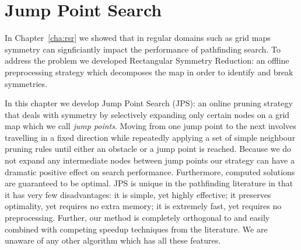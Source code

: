 \chapter{Jump Point Search}
\label{cha:jps}
In Chapter~\ref{cha:rsr} we showed that in regular domains such as grid maps
symmetry can signficiantly impact the performance of pathfinding search.
 To address the problem we developed Rectangular Symmetry Reduction:
 an offline preprocessing strategy which decomposes the map in order to 
identify and break symmetries. 

In this chapter we develop Jump Point Search (JPS): an online pruning strategy that
deals with symmetry by selectively expanding only certain nodes on a grid map
which we call \emph{jump points}.  Moving from one jump point to the next
involves travelling in a fixed direction while repeatedly applying a set of
simple neighbour pruning rules until either an obstacle or a jump point is
reached.  Because we do not expand any intermediate nodes between jump points
our strategy can have a dramatic positive effect on search performance.
Furthermore, computed solutions are guaranteed to be optimal.  
JPS is unique in the pathfinding literature in that it has very few
disadvantages: it is simple, yet highly effective; it preserves optimality, yet
requires no extra memory;  it is extremely fast, yet requires no preprocessing.
Further, our method is completely orthogonal to and easily combined with 
competing speedup techniques from the literature.
We are unaware of any other algorithm which has all these features.
